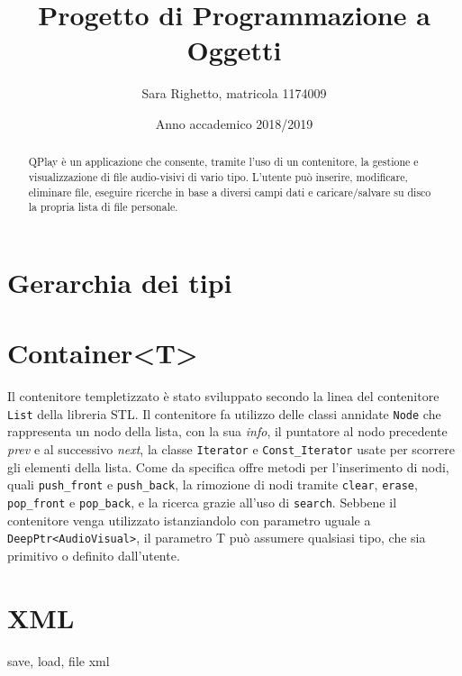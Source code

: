 

\title{Progetto di Programmazione a Oggetti}
\author{Sara Righetto, matricola 1174009}
\date{Anno accademico 2018/2019}


    \maketitle
    \begin{abstract}
        QPlay è un applicazione che consente, tramite l'uso di un contenitore, la gestione e visualizzazione di file audio-visivi di vario tipo. L'utente può inserire, modificare, eliminare file, eseguire ricerche in base a diversi campi dati e caricare/salvare su disco la propria lista di file personale.
    \end{abstract}

    \section*{Gerarchia dei tipi}
        

    \section*{Container<T>}
        Il contenitore templetizzato è stato sviluppato secondo la linea del contenitore \texttt{List} della libreria STL. \newline
        Il contenitore fa utilizzo delle classi annidate \texttt{Node} che rappresenta un nodo della lista, con la sua \textit{info}, il puntatore al nodo precedente \textit{prev} e al successivo \textit{next}, la classe \texttt{Iterator} e \texttt{Const\_Iterator} usate per scorrere gli elementi della lista.
        Come da specifica offre metodi per l'inserimento di nodi, quali \texttt{push\_front} e \texttt{push\_back}, la rimozione di nodi tramite \texttt{clear}, \texttt{erase}, \texttt{pop\_front} e \texttt{pop\_back}, e la ricerca grazie all'uso di \texttt{search}. \newline
        Sebbene il contenitore venga utilizzato istanziandolo con parametro uguale a \texttt{DeepPtr<AudioVisual>}, il parametro T può assumere qualsiasi tipo, che sia primitivo o definito dall'utente.

    \section*{XML}
        save, load, file xml

